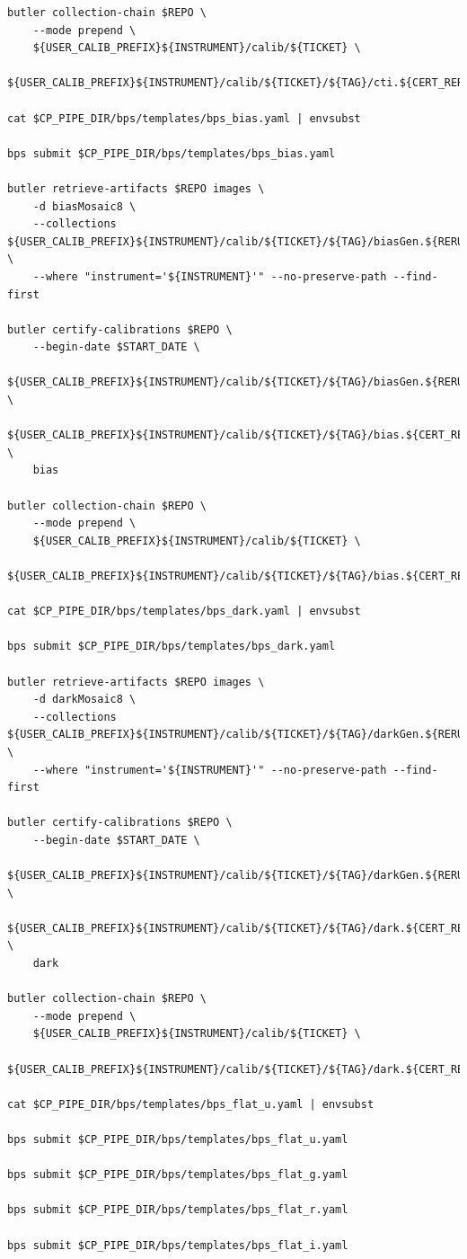 \documentclass[DM,authoryear,toc]{lsstdoc}
\begin{document}
\begin{verbatim}
butler collection-chain $REPO \
    --mode prepend \
    ${USER_CALIB_PREFIX}${INSTRUMENT}/calib/${TICKET} \
    ${USER_CALIB_PREFIX}${INSTRUMENT}/calib/${TICKET}/${TAG}/cti.${CERT_RERUN}

cat $CP_PIPE_DIR/bps/templates/bps_bias.yaml | envsubst

bps submit $CP_PIPE_DIR/bps/templates/bps_bias.yaml

butler retrieve-artifacts $REPO images \
    -d biasMosaic8 \
    --collections ${USER_CALIB_PREFIX}${INSTRUMENT}/calib/${TICKET}/${TAG}/biasGen.${RERUN} \
    --where "instrument='${INSTRUMENT}'" --no-preserve-path --find-first

butler certify-calibrations $REPO \
    --begin-date $START_DATE \
    ${USER_CALIB_PREFIX}${INSTRUMENT}/calib/${TICKET}/${TAG}/biasGen.${RERUN} \
    ${USER_CALIB_PREFIX}${INSTRUMENT}/calib/${TICKET}/${TAG}/bias.${CERT_RERUN} \
    bias

butler collection-chain $REPO \
    --mode prepend \
    ${USER_CALIB_PREFIX}${INSTRUMENT}/calib/${TICKET} \
    ${USER_CALIB_PREFIX}${INSTRUMENT}/calib/${TICKET}/${TAG}/bias.${CERT_RERUN}

cat $CP_PIPE_DIR/bps/templates/bps_dark.yaml | envsubst

bps submit $CP_PIPE_DIR/bps/templates/bps_dark.yaml

butler retrieve-artifacts $REPO images \
    -d darkMosaic8 \
    --collections ${USER_CALIB_PREFIX}${INSTRUMENT}/calib/${TICKET}/${TAG}/darkGen.${RERUN} \
    --where "instrument='${INSTRUMENT}'" --no-preserve-path --find-first

butler certify-calibrations $REPO \
    --begin-date $START_DATE \
    ${USER_CALIB_PREFIX}${INSTRUMENT}/calib/${TICKET}/${TAG}/darkGen.${RERUN} \
    ${USER_CALIB_PREFIX}${INSTRUMENT}/calib/${TICKET}/${TAG}/dark.${CERT_RERUN} \
    dark

butler collection-chain $REPO \
    --mode prepend \
    ${USER_CALIB_PREFIX}${INSTRUMENT}/calib/${TICKET} \
    ${USER_CALIB_PREFIX}${INSTRUMENT}/calib/${TICKET}/${TAG}/dark.${CERT_RERUN}

cat $CP_PIPE_DIR/bps/templates/bps_flat_u.yaml | envsubst

bps submit $CP_PIPE_DIR/bps/templates/bps_flat_u.yaml

bps submit $CP_PIPE_DIR/bps/templates/bps_flat_g.yaml

bps submit $CP_PIPE_DIR/bps/templates/bps_flat_r.yaml

bps submit $CP_PIPE_DIR/bps/templates/bps_flat_i.yaml


\end{verbatim}
\end{document}
